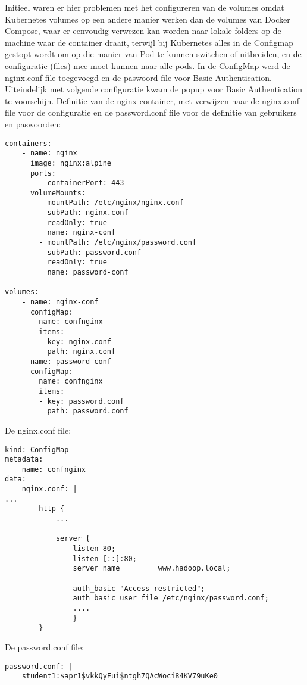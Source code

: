 Initieel waren er hier problemen met het configureren van de volumes omdat Kubernetes volumes op een andere manier werken dan de volumes van Docker Compose, waar er eenvoudig verwezen kan worden naar lokale folders op de machine waar de container draait, terwijl bij Kubernetes alles in de Configmap gestopt wordt om op die manier van Pod te kunnen switchen of uitbreiden, en de configuratie (files) mee moet kunnen naar alle pods.
\newline
\newline
In de ConfigMap werd de nginx.conf file toegevoegd en de paswoord file voor Basic Authentication.
Uiteindelijk met volgende configuratie kwam de popup voor Basic Authentication te voorschijn.
\newpage
Definitie van de nginx container, met verwijzen naar de nginx.conf file voor de configuratie en de password.conf file voor de definitie van gebruikers en paswoorden:
\newline
\begin{lstlisting}
containers:
    - name: nginx
      image: nginx:alpine
      ports:
        - containerPort: 443
      volumeMounts:
        - mountPath: /etc/nginx/nginx.conf
          subPath: nginx.conf
          readOnly: true
          name: nginx-conf
        - mountPath: /etc/nginx/password.conf
          subPath: password.conf
          readOnly: true
          name: password-conf

volumes:
    - name: nginx-conf
      configMap:
        name: confnginx
        items:
        - key: nginx.conf
          path: nginx.conf
    - name: password-conf
      configMap:
        name: confnginx
        items:
        - key: password.conf
          path: password.conf
\end{lstlisting}

De nginx.conf file:
\begin{lstlisting}
kind: ConfigMap
metadata:
    name: confnginx
data:
    nginx.conf: |
...
        http {
            ...

            server {
                listen 80;
                listen [::]:80;
                server_name         www.hadoop.local;
                
                auth_basic "Access restricted";
                auth_basic_user_file /etc/nginx/password.conf;
                ....
                }
        }
\end{lstlisting}

De password.conf file:
\begin{lstlisting}
password.conf: |
    student1:$apr1$vkkQyFui$ntgh7QAcWoci84KV79uKe0
    
\end{lstlisting}


